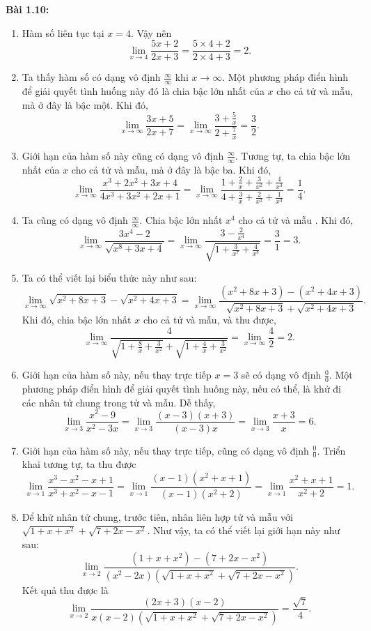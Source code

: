 \vspace{5pt}
\textbf{Bài 1.10:}
\begin{enumerate}[label=(\alph*)]   
    \item Hàm số liên tục tại \(x=4\). Vậy nên \[\lim_{x\rightarrow 4}\frac{5x+2}{2x+3}=\frac{5\times 4+2}{2\times 4+3}=2.\]
    \item Ta thấy hàm số có dạng vô định \(\frac{\infty}{\infty}\) khi \(x\rightarrow\infty\). Một phương pháp điển hình để giải quyết tình huống này đó là chia bậc lớn nhất của \(x\) cho cả tử và mẫu, mà ở đây là bậc một. Khi đó, \[\lim_{x\rightarrow\infty}\frac{3x+5}{2x+7}=\lim_{x\rightarrow\infty}\frac{3+\frac{5}{x}}{2+\frac{7}{x}}=\frac{3}{2}.\] 
    \item Giới hạn của hàm số này cũng có dạng vô định \(\frac{\infty}{\infty}\). Tương tự, ta chia bậc lớn nhất của \(x\) cho cả tử và mẫu, mà ở đây là bậc ba. Khi đó, \[\lim_{x\rightarrow\infty}\frac{x^3 +2x^2 +3x+4}{4x^3 +3x^2 +2x+1}=\lim_{x\rightarrow\infty}\frac{1+\frac{2}{x}+\frac{3}{x^2}+\frac{4}{x^3}}{4+\frac{3}{x}+\frac{2}{x^2}+\frac{1}{x^3}}=\frac{1}{4}.\]
    \item Ta cũng có dạng vô định \(\frac{\infty}{\infty}\). Chia bậc lớn nhất  \(x^4\) cho cả tử và mẫu . Khi đó, \[\lim_{x\rightarrow\infty}\frac{3x^4 -2}{\sqrt{x^8+3x+4}}=\lim_{x\rightarrow\infty}\frac{3-\frac{2}{x^4}}{\sqrt{1+\frac{3}{x^7}+\frac{4}{x^8}}}=\frac{3}{1}=3.\]
    \item Ta có thể viết lại biểu thức này như sau: \[\lim_{x\rightarrow\infty}\sqrt{x^2 +8x+3}-\sqrt{x^2+4x+3}=\lim_{x\rightarrow\infty}\frac{(x^2 +8x+3)-(x^2+4x+3)}{\sqrt{x^2 +8x+3}+\sqrt{x^2+4x+3}}.\] Khi đó, chia bậc lớn nhất \(x\) cho cả tử và mẫu, và thu được, \[\lim_{x\rightarrow\infty}\frac{4}{\sqrt{1+\frac{8}{x}+\frac{3}{x^2}}+\sqrt{1+\frac{4}{x}+\frac{3}{x^2}}}=\lim_{x\rightarrow\infty}\frac{4}{2}=2.\]
    \item Giới hạn của hàm số này, nếu thay trực tiếp \(x=3\) sẽ có dạng vô định \(\frac{0}{0}\). Một phương pháp điển hình để giải quyết tình huống này, nếu có thể, là khử đi các nhân tử chung trong tử và mẫu. Dễ thấy, \[\lim_{x\rightarrow 3}\frac{x^2 -9}{x^2-3x}=\lim_{x\rightarrow 3}\frac{(x-3)(x+3)}{(x-3)x}=\lim_{x\rightarrow 3}\frac{x+3}{x}=6.\]  
    \item Giới hạn của hàm số này, nếu thay trực tiếp, cũng có dạng vô định \(\frac{0}{0}\). Triển khai tương tự, ta thu được \[\lim_{x\rightarrow 1}\frac{x^3 -x^2 -x+1}{x^3+x^2 -x-1}=\lim_{x\rightarrow 1}\frac{(x-1)(x^2+x+1)}{(x-1)(x^2+2)}=\lim_{x\rightarrow 1}\frac{x^2+x+1}{x^2+2}=1.\]
    \item Để khử nhân tử chung, trước tiên, nhân liên hợp tử và mẫu với \(\sqrt{1+x+x^2}+\sqrt{7+2x-x^2}\). Như vậy, ta có thể viết lại giới hạn này như sau: \[\lim_{x\rightarrow 2}\frac{(1+x+x^2)-(7+2x-x^2)}{(x^2-2x)(\sqrt{1+x+x^2}+\sqrt{7+2x-x^2})}.\] Kết quả thu được là \[\lim_{x\rightarrow 2}\frac{(2x+3)(x-2)}{x(x-2)(\sqrt{1+x+x^2}+\sqrt{7+2x-x^2})}=\frac{\sqrt{7}}{4}.\]    
\end{enumerate}
\vspace{5pt}

